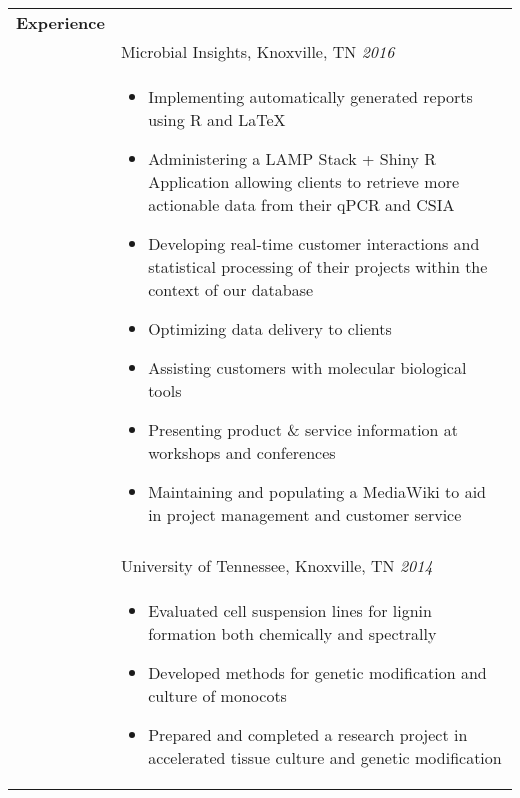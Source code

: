 \documentclass[10pt]{article}
\begin{document}
\begin{minipage}[ht]{.75\linewidth}
   \bgroup
   \def\arraystretch{.8}
   \begin{tabularx}{\linewidth}{p{1.8cm}M}
      \hline
      \textbf{Experience} &  \\
                          & Microbial Insights, Knoxville, TN \textit{2016} \\
      & \begin{itemize}[topsep=-12pt,parsep=0em]
            \setlength\itemsep{0em}
            \item Implementing automatically generated reports using R and \LaTeX %
            \item Administering a LAMP Stack + Shiny R Application allowing clients to retrieve more actionable data from their qPCR and CSIA %
            \item Developing real-time customer interactions and statistical processing of their projects within the context of our database %
            \item Optimizing data delivery to clients  %
            \item Assisting customers with molecular biological tools %
            \item Presenting product \& service information at workshops and conferences %
            \item Maintaining and populating a MediaWiki to aid in project management and customer service 
        \end{itemize} \\ 
       &  \\
       & University of Tennessee, Knoxville, TN \textit{2014} \\
       & \begin{itemize}[topsep=-12pt,parsep=0em]
            \setlength\itemsep{0em}
            \item Evaluated cell suspension lines for lignin formation both chemically and spectrally
            \item Developed methods for genetic modification and culture of monocots
            \item Prepared and completed a research project in accelerated tissue culture and genetic modification

\end{itemize}
\end{tabularx}
\end{minipage}
\end{document}
